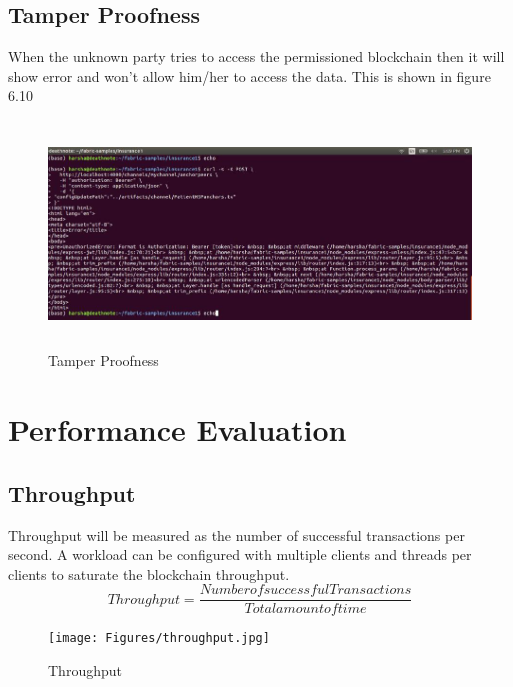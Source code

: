 \subsection{Tamper Proofness}
When the unknown party tries to access the permissioned
blockchain then it will show error and won’t allow him/her to access
the data. This is shown in figure 6.10
\begin{figure}[htb!]
  \centering
 \includegraphics[width = 15cm, height = 6cm] {Figures/tamper.jpg}
  \caption{Tamper Proofness}
  \label{StH}	
\end{figure}

\section{Performance Evaluation}
\subsection{Throughput}
Throughput will be measured as the number of successful transactions
per second. A workload can be configured with multiple clients and
threads per clients to saturate the blockchain throughput.
\[Throughput=\frac{Number of successful Transactions}{Total amount of time}\]
\begin{figure}[htb!]
  \centering
 \texttt{[image: Figures/throughput.jpg]}
  \caption{Throughput}
  \label{StH}	
\end{figure}